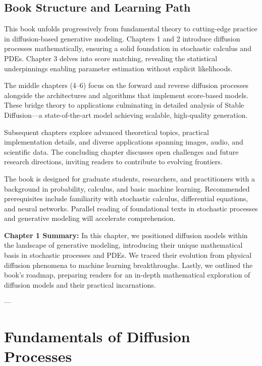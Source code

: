 \documentclass[a4paper,12pt,oneside]{memoir}
\begin{document}
\section{Book Structure and Learning Path}

This book unfolds progressively from fundamental theory to cutting-edge practice in diffusion-based generative modeling. Chapters 1 and 2 introduce diffusion processes mathematically, ensuring a solid foundation in stochastic calculus and PDEs. Chapter 3 delves into score matching, revealing the statistical underpinnings enabling parameter estimation without explicit likelihoods.

The middle chapters (4–6) focus on the forward and reverse diffusion processes alongside the architectures and algorithms that implement score-based models. These bridge theory to applications culminating in detailed analysis of Stable Diffusion—a state-of-the-art model achieving scalable, high-quality generation.

Subsequent chapters explore advanced theoretical topics, practical implementation details, and diverse applications spanning images, audio, and scientific data. The concluding chapter discusses open challenges and future research directions, inviting readers to contribute to evolving frontiers.

The book is designed for graduate students, researchers, and practitioners with a background in probability, calculus, and basic machine learning. Recommended prerequisites include familiarity with stochastic calculus, differential equations, and neural networks. Parallel reading of foundational texts in stochastic processes \cite{Oksendal2003} and generative modeling \cite{Goodfellow2016} will accelerate comprehension.

\textbf{Chapter 1 Summary:}  
In this chapter, we positioned diffusion models within the landscape of generative modeling, introducing their unique mathematical basis in stochastic processes and PDEs. We traced their evolution from physical diffusion phenomena to machine learning breakthroughs. Lastly, we outlined the book's roadmap, preparing readers for an in-depth mathematical exploration of diffusion models and their practical incarnations.

---

\chapter{Fundamentals of Diffusion Processes}
\end{document}
